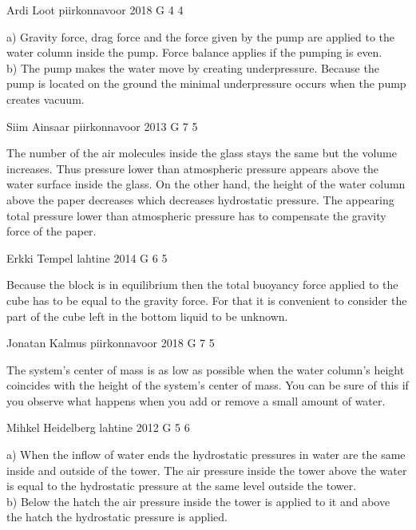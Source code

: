 \documentclass[11pt]{article}
\begin{document}
{Ardi Loot} %
{piirkonnavoor} %
{2018} %
{G 4} %
{4} %
{

\ifEngHint
a) Gravity force, drag force and the force given by the pump are applied to the water column inside the pump. Force balance applies if the pumping is even.\\ 
b) The pump makes the water move by creating underpressure. Because the pump is located on the ground the minimal underpressure occurs when the pump creates vacuum.
\fi
}

{Siim Ainsaar} %
{piirkonnavoor} %
{2013} %
{G 7} %
{5} %
{

\ifEngHint
The number of the air molecules inside the glass stays the same but the volume increases. Thus pressure lower than atmospheric pressure appears above the water surface inside the glass. On the other hand, the height of the water column above the paper decreases which decreases hydrostatic pressure. The appearing total pressure lower than atmospheric pressure has to compensate the gravity force of the paper.
\fi
}

{Erkki Tempel} %
{lahtine} %
{2014} %
{G 6} %
{5} %
{

\ifEngHint
Because the block is in equilibrium then the total buoyancy force applied to the cube has to be equal to the gravity force. For that it is convenient to consider the part of the cube left in the bottom liquid to be unknown.
\fi
}

{Jonatan Kalmus} %
{piirkonnavoor} %
{2018} %
{G 7} %
{5} %
{

\ifEngHint
The system’s center of mass is as low as possible when the water column’s height coincides with the height of the system’s center of mass. You can be sure of this if you observe what happens when you add or remove a small amount of water.
\fi
}

{Mihkel Heidelberg} %
{lahtine} %
{2012} %
{G 5} %
{6} %
{

\ifEngHint
a) When the inflow of water ends the hydrostatic pressures in water are the same inside and outside of the tower. The air pressure inside the tower above the water is equal to the hydrostatic pressure at the same level outside the tower.\\
b) Below the hatch the air pressure inside the tower is applied to it and above the hatch the hydrostatic pressure is applied.
\fi
}
\end{document}
